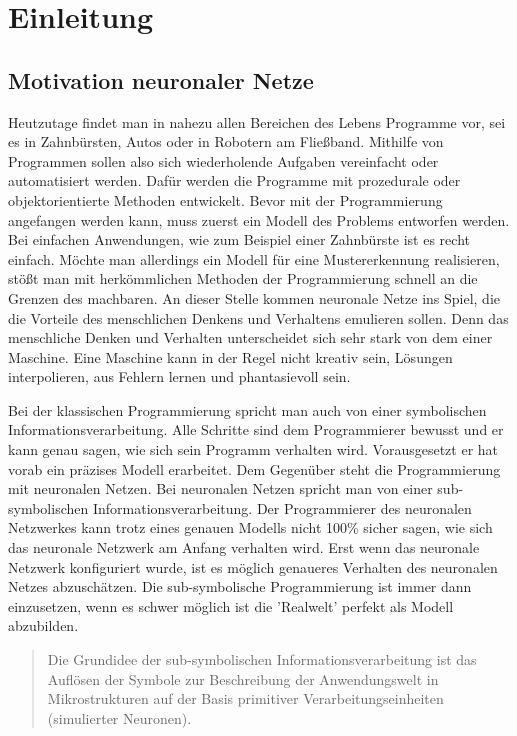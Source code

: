 \section{Einleitung}

\subsection{Motivation neuronaler Netze}
Heutzutage findet man in nahezu allen Bereichen des Lebens Programme vor, sei es in Zahnbürsten, Autos oder in Robotern am Fließband. Mithilfe von Programmen sollen also sich wiederholende Aufgaben vereinfacht oder automatisiert werden. Dafür werden die Programme mit prozedurale oder objektorientierte Methoden entwickelt. Bevor mit der Programmierung angefangen werden kann, muss zuerst ein Modell des Problems entworfen werden. Bei einfachen Anwendungen, wie zum Beispiel einer Zahnbürste ist es recht einfach. Möchte man allerdings ein Modell für eine Mustererkennung realisieren, stößt man mit herkömmlichen Methoden der Programmierung schnell an die Grenzen des machbaren. An dieser Stelle kommen neuronale Netze ins Spiel, die die Vorteile des menschlichen Denkens und Verhaltens emulieren sollen. Denn das menschliche Denken und Verhalten unterscheidet sich sehr stark von dem einer Maschine. Eine Maschine kann in der Regel nicht kreativ sein, Lösungen interpolieren, aus Fehlern lernen und phantasievoll sein.

Bei der klassischen Programmierung spricht man auch von einer symbolischen Informationsverarbeitung. Alle Schritte sind dem Programmierer bewusst und er kann genau sagen, wie sich sein Programm verhalten wird. Vorausgesetzt er hat vorab ein präzises Modell erarbeitet. Dem Gegenüber steht die Programmierung mit neuronalen Netzen. Bei neuronalen Netzen spricht man von einer sub-symbolischen Informationsverarbeitung. Der Programmierer des neuronalen Netzwerkes kann trotz eines genauen Modells nicht 100\% sicher sagen, wie sich das neuronale Netzwerk am Anfang verhalten wird. Erst wenn das neuronale Netzwerk konfiguriert wurde, ist es möglich genaueres Verhalten des neuronalen Netzes abzuschätzen. Die sub-symbolische Programmierung ist immer dann einzusetzen, wenn es schwer möglich ist die 'Realwelt' perfekt als Modell abzubilden. 

\begin{quote}
    Die Grundidee der sub-symbolischen Informationsverarbeitung ist das Auflösen der Symbole zur Beschreibung der Anwendungswelt in Mikrostrukturen auf der Basis primitiver Verarbeitungseinheiten (simulierter Neuronen). \cite[S. 9]{Kratzer1991} 
\end{quote}

